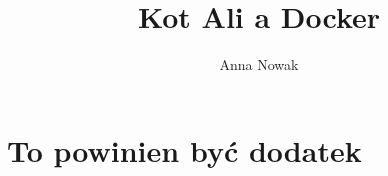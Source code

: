 \documentclass[inzynier,druk,ramka]{dyplom}
\author{Anna Nowak}
\title{Kot Ali a Docker}
\begin{document}
\maketitle

\tableofcontents

\listoffigures


\listoftables











\appendixpage
\appendix

\chapter{To powinien być dodatek}\label{Dod1}

\lipsum[9-11]




\end{document}
